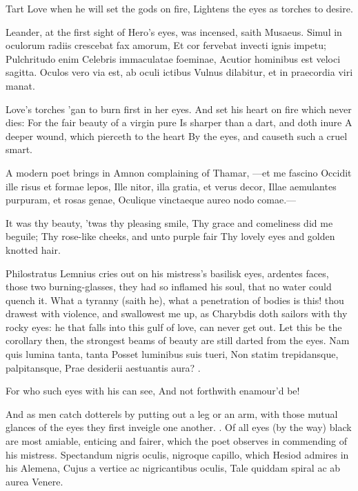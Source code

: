 Tart Love when he will set the gods on fire,
Lightens the eyes as torches to desire.

Leander, at the first sight of Hero's eyes, was incensed, saith
Musaeus.
Simul in oculorum radiis crescebat fax amorum,
Et cor fervebat invecti ignis impetu;
Pulchritudo enim Celebris immaculatae foeminae,
Acutior hominibus est veloci sagitta.
Oculos vero via est, ab oculi ictibus
Vulnus dilabitur, et in praecordia viri manat.

Love's torches 'gan to burn first in her eyes.
And set his heart on fire which never dies:
For the fair beauty of a virgin pure
Is sharper than a dart, and doth inure
A deeper wound, which pierceth to the heart
By the eyes, and causeth such a cruel smart.

A modern poet brings in Amnon complaining of Thamar,
---et me fascino
Occidit ille risus et formae lepos,
Ille nitor, illa gratia, et verus decor,
Illae aemulantes purpuram, et rosas genae,
Oculique vinctaeque aureo nodo comae.---

It was thy beauty, 'twas thy pleasing smile,
Thy grace and comeliness did me beguile;
Thy rose-like cheeks, and unto purple fair
Thy lovely eyes and golden knotted hair.

Philostratus Lemnius cries out on his mistress's basilisk eyes,
ardentes faces, those two burning-glasses, they had so inflamed his
soul, that no water could quench it. What a tyranny (saith he), what a
penetration of bodies is this! thou drawest with violence, and
swallowest me up, as Charybdis doth sailors with thy rocky eyes: he
that falls into this gulf of love, can never get out. Let this be the
corollary then, the strongest beams of beauty are still darted from the
eyes.
Nam quis lumina tanta, tanta
Posset luminibus suis tueri,
Non statim trepidansque, palpitansque,
Prae desiderii aestuantis aura? \etc{}.

For who such eyes with his can see,
And not forthwith enamour'd be!

And as men catch dotterels by putting out a leg or an arm, with those
mutual glances of the eyes they first inveigle one another.
. Of all eyes (by the
way) black are most amiable, enticing and fairer, which the poet
observes in commending of his mistress. Spectandum nigris oculis,
nigroque capillo, which Hesiod admires in his Alemena,
Cujus a vertice ac nigricantibus oculis,
Tale quiddam spiral ac ab aurea Venere.

